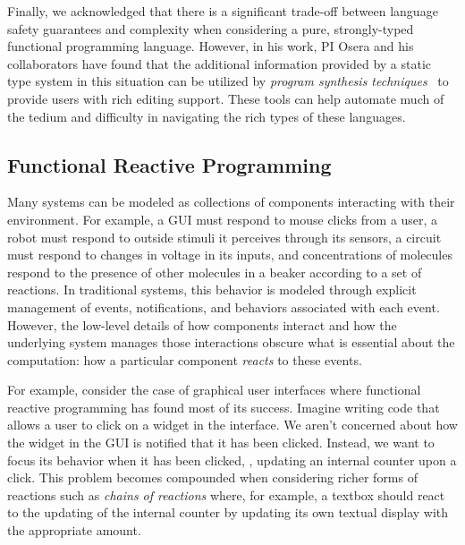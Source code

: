 Finally, we acknowledged that there is a significant trade-off between language safety guarantees and complexity when considering a pure, strongly-typed functional programming language.
However, in his work, PI Osera and his collaborators have found that the additional information provided by a static type system in this situation can be utilized by \emph{program synthesis techniques}~\cite{osera:thesis:2015} to provide users with rich editing support.
These tools can help automate much of the tedium and difficulty in navigating the rich types of these languages.


\subsection{Functional Reactive Programming}
Many systems can be modeled as collections of components interacting with their environment.
For example, a GUI must respond to mouse clicks from a user, a robot must respond to outside stimuli it perceives through its sensors, a circuit must respond to changes in voltage in its inputs, and concentrations of molecules respond to the presence of other molecules in a beaker according to a set of reactions.
In traditional systems, this behavior is modeled through explicit management of events, notifications, and behaviors associated with each event.
However, the low-level details of how components interact and how the underlying system manages those interactions obscure what is essential about the computation: how a particular component \emph{reacts} to these events.

For example, consider the case of graphical user interfaces where functional reactive programming has found most of its success.
Imagine writing code that allows a user to click on a widget in the interface.
We aren't concerned about how the widget in the GUI is notified that it has been clicked.
Instead, we want to focus its behavior when it has been clicked, \eg, updating an internal counter upon a click.
This problem becomes compounded when considering richer forms of reactions such as \emph{chains of reactions} where, for example, a textbox should react to the updating of the internal counter by updating its own textual display with the appropriate amount.

